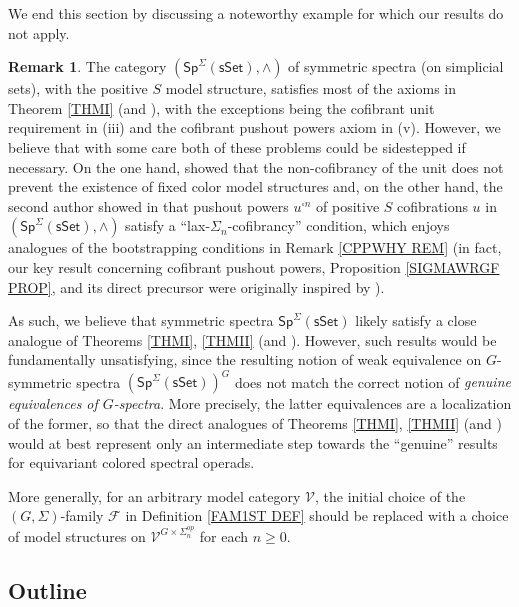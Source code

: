 \documentclass[a4paper,10pt
]{article}%
\numberwithin{equation}{section}
\numberwithin{figure}{section}
\theoremstyle{definition} %
\newtheorem{remark}[equation]{Remark}%
\newcommand{\F}{\ensuremath{\mathcal F}}
\newcommand{\V}{\ensuremath{\mathcal V}}
\newcommand{\1}{\ensuremath{\mathbbm 1}}%
\begin{document}
We end this section by discussing a noteworthy 
example for which our results do not apply.


\begin{remark}\label{SPNONEX REM}
	The category $(\mathsf{Sp}^{\Sigma}(\mathsf{sSet}),\wedge)$
	of symmetric spectra (on simplicial sets),
	with the positive $S$ model structure,
	satisfies most of the axioms in Theorem
	\ref{THMI} (and \cite[Thm. \ref{AC-THMA}]{BP_ACOP}), 
	with the exceptions being 
	the cofibrant unit requirement in (iii)
	and the cofibrant pushout powers axiom in (v).
	However, we believe that with some care 
	both of these problems could be sidestepped
	if necessary. 
	On the one hand, \cite{GV12}
	showed that the non-cofibrancy of the unit 
	does not prevent the existence of fixed color model structures
	and, on the other hand, 
	the second author showed in \cite{Pe16}
	that pushout powers $u^{\square n}$ of positive $S$ cofibrations $u$
	in $(\mathsf{Sp}^{\Sigma}(\mathsf{sSet}),\wedge)$
	satisfy a ``lax-$\Sigma_n$-cofibrancy'' condition,
	which enjoys analogues of the bootstrapping conditions
	in Remark \ref{CPPWHY REM}
	(in fact, our key result concerning cofibrant pushout powers,
	Proposition \ref{SIGMAWRGF PROP}, and its direct precursor
	\cite[Prop. 6.25]{BP21}
	were originally inspired by \cite[Thm. 1.2]{Pe16}).

	As such, we believe that symmetric spectra
	$\mathsf{Sp}^{\Sigma}(\mathsf{sSet})$
	likely satisfy a close analogue of Theorems 
	\ref{THMI}, \ref{THMII} (and \cite[Thm. \ref{AC-THMA}]{BP_ACOP}).
	However, such results 
	would be fundamentally unsatisfying, 
	since the resulting notion of weak equivalence on
	$G$-symmetric spectra
	$\left(\mathsf{Sp}^{\Sigma}(\mathsf{sSet})\right)^G$
	does not match the correct notion of 
	\emph{genuine equivalences of $G$-spectra}.
	More precisely, the latter equivalences are a localization of the former, so that the direct analogues of 
	Theorems \ref{THMI}, \ref{THMII} (and \cite[Thm. \ref{AC-THMA}]{BP_ACOP})
	would at best represent only an intermediate step
	towards the ``genuine'' results
	for equivariant colored spectral operads.

	More generally,
	for an arbitrary model category $\V$,
	the initial choice of the $(G,\Sigma)$-family $\F$ in  
	Definition \ref{FAM1ST DEF}
	should be replaced with a choice of model structures on
	$\V^{G \times \Sigma_n^{op}}$
	for each $n \geq 0$.	 
\end{remark}



\subsection{Outline}
\end{document}
